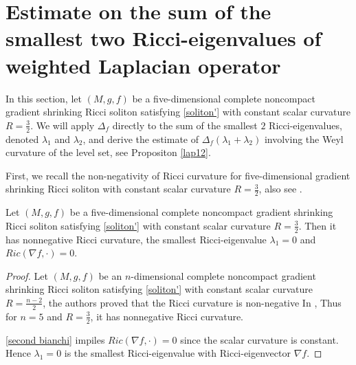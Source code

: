 \documentclass[12pt]{amsart}
\newtheorem{theo}{Theorem}[section]
\begin{document}
	
	\section{Estimate on the sum of the smallest two Ricci-eigenvalues of weighted Laplacian operator}\label{sec3}
	In this section, let $(M, g, f)$ be a five-dimensional complete noncompact gradient shrinking Ricci soliton satisfying \eqref{soliton'} with constant scalar curvature $R=\frac{3}{2}$. We will apply $\Delta_f$ directly to the sum of the smallest $2$ Ricci-eigenvalues, denoted $\lambda_1$ and $\lambda_2$, and derive the estimate of $\Delta_f(\lambda_1+\lambda_2)$ involving the Weyl curvature of the level set, see Propositon \ref{lap12}.
	
	First, we recall the non-negativity of Ricci curvature for five-dimensional gradient shrinking Ricci soliton with constant scalar curvature $R=\frac{3}{2}$, also see \cite{FR16}.
	\begin{prop}[\cite{FR16}] \label{positive}
		Let $(M, g, f)$ be a five-dimensional complete noncompact gradient shrinking Ricci soliton satisfying \eqref{soliton'} with constant scalar curvature $R=\frac{3}{2}$. Then it has nonnegative Ricci curvature, the smallest Ricci-eigenvalue $\lambda_1=0$ and $Ric(\nabla f,\cdot)=0$.
	\end{prop}
	\begin{proof}
		Let $(M, g, f)$ be an $n$-dimensional complete noncompact gradient shrinking Ricci soliton satisfying \eqref{soliton'} with constant scalar curvature $R=\frac{n-2}{2}$, the authors proved that  the Ricci curvature is non-negative In \cite{FR16}, Thus for $n=5$ and $R=\frac{3}{2}$, it has nonnegative Ricci curvature.
		
		\smallskip
		\eqref{second bianchi} impiles $Ric(\nabla f,\cdot)=0$ since the scalar curvature is constant.
		Hence $\lambda_1=0$ is the smallest Ricci-eigenvalue with Ricci-eigenvector $\nabla f$.
		
	\end{proof}
	
\end{document}
